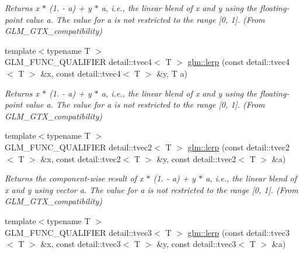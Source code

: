 \begin{DoxyCompactItemize}
\begin{DoxyCompactList}\small\item\em Returns x $\ast$ (1. -\/ a) + y $\ast$ a, i.\+e., the linear blend of x and y using the floating-\/point value a. The value for a is not restricted to the range \mbox{[}0, 1\mbox{]}. (From G\+L\+M\+\_\+\+G\+T\+X\+\_\+compatibility) \end{DoxyCompactList}\item 
\hypertarget{group__gtx__compatibility_gae3cac5586d127568383d7df9d258a443}{}{\footnotesize template$<$typename T $>$ }\\G\+L\+M\+\_\+\+F\+U\+N\+C\+\_\+\+Q\+U\+A\+L\+I\+F\+I\+E\+R detail\+::tvec4$<$ T $>$ \hyperlink{group__gtx__compatibility_gae3cac5586d127568383d7df9d258a443}{glm\+::lerp} (const detail\+::tvec4$<$ T $>$ \&x, const detail\+::tvec4$<$ T $>$ \&y, T a)\label{group__gtx__compatibility_gae3cac5586d127568383d7df9d258a443}

\begin{DoxyCompactList}\small\item\em Returns x $\ast$ (1. -\/ a) + y $\ast$ a, i.\+e., the linear blend of x and y using the floating-\/point value a. The value for a is not restricted to the range \mbox{[}0, 1\mbox{]}. (From G\+L\+M\+\_\+\+G\+T\+X\+\_\+compatibility) \end{DoxyCompactList}\item 
\hypertarget{group__gtx__compatibility_ga535230f9887c77a056e535c3c7cf741c}{}{\footnotesize template$<$typename T $>$ }\\G\+L\+M\+\_\+\+F\+U\+N\+C\+\_\+\+Q\+U\+A\+L\+I\+F\+I\+E\+R detail\+::tvec2$<$ T $>$ \hyperlink{group__gtx__compatibility_ga535230f9887c77a056e535c3c7cf741c}{glm\+::lerp} (const detail\+::tvec2$<$ T $>$ \&x, const detail\+::tvec2$<$ T $>$ \&y, const detail\+::tvec2$<$ T $>$ \&a)\label{group__gtx__compatibility_ga535230f9887c77a056e535c3c7cf741c}

\begin{DoxyCompactList}\small\item\em Returns the component-\/wise result of x $\ast$ (1. -\/ a) + y $\ast$ a, i.\+e., the linear blend of x and y using vector a. The value for a is not restricted to the range \mbox{[}0, 1\mbox{]}. (From G\+L\+M\+\_\+\+G\+T\+X\+\_\+compatibility) \end{DoxyCompactList}\item 
\hypertarget{group__gtx__compatibility_ga9e840980e570e588d18793ecfe152bc4}{}{\footnotesize template$<$typename T $>$ }\\G\+L\+M\+\_\+\+F\+U\+N\+C\+\_\+\+Q\+U\+A\+L\+I\+F\+I\+E\+R detail\+::tvec3$<$ T $>$ \hyperlink{group__gtx__compatibility_ga9e840980e570e588d18793ecfe152bc4}{glm\+::lerp} (const detail\+::tvec3$<$ T $>$ \&x, const detail\+::tvec3$<$ T $>$ \&y, const detail\+::tvec3$<$ T $>$ \&a)\label{group__gtx__compatibility_ga9e840980e570e588d18793ecfe152bc4}


\end{DoxyCompactItemize}
